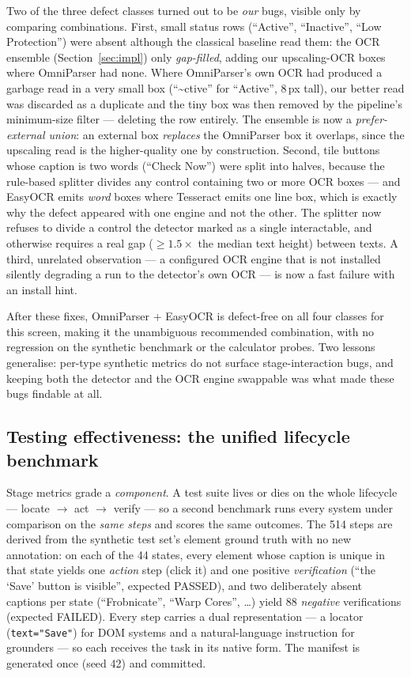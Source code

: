 \documentclass[11pt,a4paper]{article}
\newcommand{\code}[1]{\texttt{#1}}
\begin{document}
Two of the three defect classes turned out to be \emph{our} bugs, visible only by
comparing combinations. First, small status rows (``Active'', ``Inactive'',
``Low Protection'') were absent although the classical baseline read them: the OCR
ensemble (Section~\ref{sec:impl}) only \emph{gap-filled}, adding our
upscaling-OCR boxes where OmniParser had none. Where OmniParser's own OCR had
produced a garbage read in a very small box (``\textasciitilde ctive'' for
``Active'', 8\,px tall), our better read was discarded as a duplicate and the tiny
box was then removed by the pipeline's minimum-size filter --- deleting the row
entirely. The ensemble is now a \emph{prefer-external union}: an external box
\emph{replaces} the OmniParser box it overlaps, since the upscaling read is the
higher-quality one by construction. Second, tile buttons whose caption is two words
(``Check Now'') were split into halves, because the rule-based splitter divides any
control containing two or more OCR boxes --- and EasyOCR emits \emph{word} boxes
where Tesseract emits one line box, which is exactly why the defect appeared with
one engine and not the other. The splitter now refuses to divide a control the
detector marked as a single interactable, and otherwise requires a real gap
($\geq 1.5\times$ the median text height) between texts. A third, unrelated
observation --- a configured OCR engine that is not installed silently degrading a
run to the detector's own OCR --- is now a fast failure with an install hint.

After these fixes, OmniParser + EasyOCR is defect-free on all four classes for
this screen, making it the unambiguous recommended combination, with no regression
on the synthetic benchmark or the calculator probes. Two lessons generalise:
per-type synthetic metrics do not surface stage-interaction bugs, and keeping both
the detector and the OCR engine swappable was what made these bugs findable at all.

\subsection{Testing effectiveness: the unified lifecycle benchmark}
\label{sec:lifecycle}
Stage metrics grade a \emph{component}. A test suite lives or dies on the whole
lifecycle --- locate $\rightarrow$ act $\rightarrow$ verify --- so a second benchmark
runs every system under comparison on the \emph{same steps} and scores the same
outcomes. The 514 steps are derived from the synthetic test set's element ground
truth with no new annotation: on each of the 44 states, every element whose caption
is unique in that state yields one \emph{action} step (click it) and one positive
\emph{verification} (``the `Save' button is visible'', expected PASSED), and two
deliberately absent captions per state (``Frobnicate'', ``Warp Cores'', \ldots) yield
88 \emph{negative} verifications (expected FAILED). Every step carries a dual
representation --- a locator (\code{text="Save"}) for DOM systems and a
natural-language instruction for grounders --- so each receives the task in its
native form. The manifest is generated once (seed 42) and committed.
\end{document}
